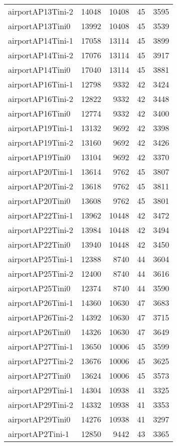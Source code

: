 \begin{longtable}{lrrrr}
airportAP13Tini-2 & 14048 & 10408 & 45 & 3595 \\
airportAP13Tini0 & 13992 & 10408 & 45 & 3539 \\
airportAP14Tini-1 & 17058 & 13114 & 45 & 3899 \\
airportAP14Tini-2 & 17076 & 13114 & 45 & 3917 \\
airportAP14Tini0 & 17040 & 13114 & 45 & 3881 \\
airportAP16Tini-1 & 12798 & 9332 & 42 & 3424 \\
airportAP16Tini-2 & 12822 & 9332 & 42 & 3448 \\
airportAP16Tini0 & 12774 & 9332 & 42 & 3400 \\
airportAP19Tini-1 & 13132 & 9692 & 42 & 3398 \\
airportAP19Tini-2 & 13160 & 9692 & 42 & 3426 \\
airportAP19Tini0 & 13104 & 9692 & 42 & 3370 \\
airportAP20Tini-1 & 13614 & 9762 & 45 & 3807 \\
airportAP20Tini-2 & 13618 & 9762 & 45 & 3811 \\
airportAP20Tini0 & 13608 & 9762 & 45 & 3801 \\
airportAP22Tini-1 & 13962 & 10448 & 42 & 3472 \\
airportAP22Tini-2 & 13984 & 10448 & 42 & 3494 \\
airportAP22Tini0 & 13940 & 10448 & 42 & 3450 \\
airportAP25Tini-1 & 12388 & 8740 & 44 & 3604 \\
airportAP25Tini-2 & 12400 & 8740 & 44 & 3616 \\
airportAP25Tini0 & 12374 & 8740 & 44 & 3590 \\
airportAP26Tini-1 & 14360 & 10630 & 47 & 3683 \\
airportAP26Tini-2 & 14392 & 10630 & 47 & 3715 \\
airportAP26Tini0 & 14326 & 10630 & 47 & 3649 \\
airportAP27Tini-1 & 13650 & 10006 & 45 & 3599 \\
airportAP27Tini-2 & 13676 & 10006 & 45 & 3625 \\
airportAP27Tini0 & 13624 & 10006 & 45 & 3573 \\
airportAP29Tini-1 & 14304 & 10938 & 41 & 3325 \\
airportAP29Tini-2 & 14332 & 10938 & 41 & 3353 \\
airportAP29Tini0 & 14276 & 10938 & 41 & 3297 \\
airportAP2Tini-1 & 12850 & 9442 & 43 & 3365 \\

\end{longtable}
